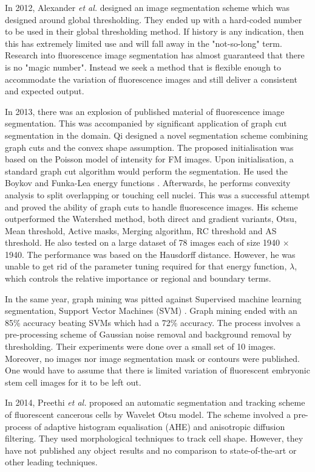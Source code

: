 \begin{definition}
	In 2012, Alexander \textit{et al.} \cite{Anielski2012} designed an image segmentation scheme which was designed around global thresholding. They ended up with a hard-coded number to be used in their global thresholding method. If history is any indication, then this has extremely limited use and will fall away in the "not-so-long" term. Research into fluorescence image segmentation has almost guaranteed that there is no "magic number". Instead we seek a method that is flexible enough to accommodate the variation of fluorescence images and still deliver a consistent and expected output.
	
	In 2013, there was an explosion of published material of fluorescence image segmentation. This was accompanied by significant application of graph cut segmentation in the domain. Qi \cite{Qi2013} designed a novel segmentation scheme combining graph cuts and the convex shape assumption. The proposed initialisation was based on the Poisson model of intensity for FM images. Upon initialisation, a standard graph cut algorithm would perform the segmentation. He used the Boykov and Funka-Lea energy functions \cite{Boykov2006}.
	Afterwards, he performs convexity analysis to split overlapping or touching cell nuclei. This was a successful attempt and proved the ability of graph cuts to handle fluorescence images. His scheme outperformed the Watershed method, both direct and gradient variants, Otsu, Mean threshold, Active masks, Merging algorithm, RC threshold and AS threshold. He also tested on a large dataset of 78 images each of size 1940 $\times$ 1940. The performance was based on the Hausdorff distance. However, he was unable to get rid of the parameter tuning required for that energy function, $\lambda$, which controls the relative importance or regional and boundary terms.
	
	In the same year, graph mining was pitted against Supervised machine learning segmentation, Support Vector Machines (SVM) \cite{Hossain2013}. Graph mining ended with an 85\% accuracy beating SVMs which had a 72\% accuracy. The process involves a pre-processing scheme of Gaussian noise removal and background removal by thresholding. Their experiments were done over a small set of 10 images. Moreover, no images nor image segmentation mask or contours were published. One would have to assume that there is limited variation of fluorescent embryonic stem cell images for it to be left out.
	
	In 2014, Preethi \textit{et al.} \cite{Preethi2014} proposed an automatic segmentation and tracking scheme of fluorescent cancerous cells by Wavelet Otsu model. The scheme involved a pre-process of adaptive histogram equalisation (AHE) and anisotropic diffusion filtering. They used morphological techniques to track cell shape. However, they have not published any object results and no comparison to state-of-the-art or other leading techniques.
	

\end{definition}
